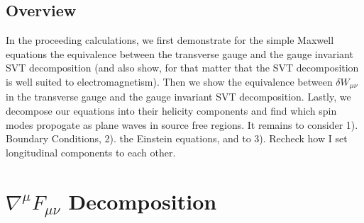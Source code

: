 \documentclass[10pt,letterpaper]{article}
\numberwithin{equation}{subsection}
\begin{document}
\subsection{Overview}
In the proceeding calculations, we first demonstrate for the simple Maxwell equations the equivalence between the transverse gauge and the gauge invariant SVT decomposition (and also show, for that matter that the SVT decomposition is well suited to electromagnetism). Then we show the equivalence between $\delta W_{\mu\nu}$ in the transverse gauge and the gauge invariant SVT decomposition. Lastly, we decompose our equations into their helicity components and find which spin  modes propogate as plane waves in source free regions. It remains to consider 1). Boundary Conditions, 2). the Einstein equations, and to 3). Recheck how I set longitudinal components to each other.
\section{$\nabla^\mu F_{\mu\nu}$ Decomposition}
\end{document}
